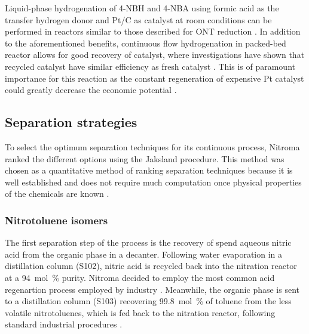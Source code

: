 Liquid-phase hydrogenation of 4-NBH and 4-NBA using formic acid as the transfer hydrogen donor and Pt/C as catalyst at room conditions can be performed in reactors similar to those described for ONT reduction . In addition to the aforementioned benefits, continuous flow hydrogenation in packed-bed reactor allows for good recovery of catalyst, where investigations have shown that recycled catalyst have similar efficiency as fresh catalyst \cite{rahman_fast_2020}. This is of paramount importance for this reaction as the constant regeneration of expensive Pt catalyst could greatly decrease the economic potential \cite{rahman_fast_2020}. 


\subsection{Separation strategies}

To select the optimum separation techniques for its continuous process, Nitroma ranked the different options using the Jaksland procedure. This method was chosen as a quantitative method of ranking separation techniques because it is well established and does not require much computation once physical properties of the chemicals are known \cite{jaksland_separation_1995}. 

\subsubsection{Nitrotoluene isomers}

The first separation step of the process is the recovery of spend  aqueous nitric acid from the organic phase in a decanter. Following water evaporation in a distillation column (S102), nitric acid is recycled back into the nitration reactor at a \SI{94}{mol\percent} purity. Nitroma decided to employ the most common acid regenartion process employed by industry \cite{dugal_nitrobenzene_2005}. Meanwhile, the organic phase is sent to a distillation column (S103) recovering \SI{99.8}{mol\percent} of toluene from the less volatile nitrotoluenes, which is fed back to the nitration reactor, following standard industrial procedures \cite{bowers_toluidines_2000}.

